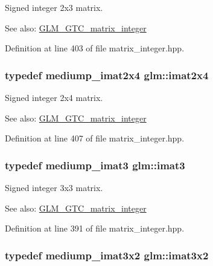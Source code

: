 Signed integer 2x3 matrix. \begin{Desc}
\item[See also:]\hyperlink{group__gtc__matrix__integer}{GLM\_\-GTC\_\-matrix\_\-integer} \end{Desc}


Definition at line 403 of file matrix\_\-integer.hpp.\hypertarget{group__gtc__matrix__integer_gfe2d058e164fd1badace451ffcf4ae46}{
\subsubsection[imat2x4]{\setlength{\rightskip}{0pt plus 5cm}typedef mediump\_\-imat2x4 {\bf glm::imat2x4}}}
\label{group__gtc__matrix__integer_gfe2d058e164fd1badace451ffcf4ae46}


Signed integer 2x4 matrix. \begin{Desc}
\item[See also:]\hyperlink{group__gtc__matrix__integer}{GLM\_\-GTC\_\-matrix\_\-integer} \end{Desc}


Definition at line 407 of file matrix\_\-integer.hpp.\hypertarget{group__gtc__matrix__integer_g45481922dd07a3a8e23758286311ee97}{
\subsubsection[imat3]{\setlength{\rightskip}{0pt plus 5cm}typedef mediump\_\-imat3 {\bf glm::imat3}}}
\label{group__gtc__matrix__integer_g45481922dd07a3a8e23758286311ee97}


Signed integer 3x3 matrix. \begin{Desc}
\item[See also:]\hyperlink{group__gtc__matrix__integer}{GLM\_\-GTC\_\-matrix\_\-integer} \end{Desc}


Definition at line 391 of file matrix\_\-integer.hpp.\hypertarget{group__gtc__matrix__integer_g04deef94cdfdd3b3b2706e10a32ef7f3}{
\subsubsection[imat3x2]{\setlength{\rightskip}{0pt plus 5cm}typedef mediump\_\-imat3x2 {\bf glm::imat3x2}}}
\label{group__gtc__matrix__integer_g04deef94cdfdd3b3b2706e10a32ef7f3}


